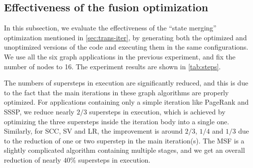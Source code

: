\documentclass{sokendai_thesis} %
\begin{document}
\subsection{Effectiveness of the fusion optimization}

\begin{table}[t]
 \centering
 \caption{Comparison of the compiler-generated programs before/after optimization}
 \label{tab:steps}
\end{table}

In this subsection, we evaluate the effectiveness of the ``state merging'' optimization mentioned in \autoref{sec:trans-iter}, by generating both the optimized and unoptimized versions of the code and executing them in the same configurations.
We use all the six graph applications in the previous experiment, and fix the number of nodes to 16.
The experiment results are shown in \autoref{tab:steps}.

The numbers of supersteps in execution are significantly reduced, and this is due to the fact that the main iterations in these graph algorithms are properly optimized.
For applications containing only a simple iteration like PageRank and SSSP, we reduce nearly $2/3$ supersteps in execution, which is achieved by optimizing the three supersteps inside the iteration body into a single one.
Similarly, for SCC, SV and LR, the improvement is around $2/3$, $1/4$ and $1/3$ due to the reduction of one or two superstep in the main iteration(s).
The MSF is a slightly complicated algorithm containing multiple stages, and we get an overall reduction of nearly $40\%$ supersteps in execution.
\end{document}
